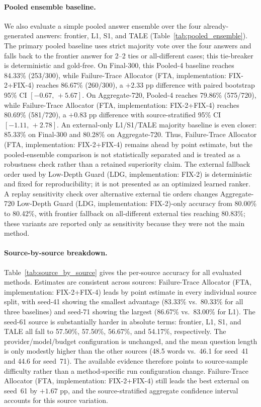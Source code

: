 \paragraph{Pooled ensemble baseline.}
We also evaluate a simple pooled answer ensemble over the four already-generated
answers: frontier, L1, S1, and TALE (Table~\ref{tab:pooled_ensemble}).
The primary pooled baseline uses strict majority vote over the four answers and
falls back to the frontier answer for 2--2 ties or all-different cases; this
tie-breaker is deterministic and gold-free.
On Final-300, this Pooled-4 baseline reaches 84.33\% (253/300), while Failure-Trace Allocator (FTA, implementation: FIX-2+FIX-4)
reaches 86.67\% (260/300), a $+2.33$ pp difference with paired bootstrap 95\% CI
$[-0.67,\,+5.67]$.
On Aggregate-720, Pooled-4 reaches 79.86\% (575/720), while Failure-Trace Allocator (FTA, implementation: FIX-2+FIX-4) reaches
80.69\% (581/720), a $+0.83$ pp difference with source-stratified 95\% CI
$[-1.11,\,+2.78]$.
An external-only L1/S1/TALE majority baseline is even closer: 85.33\% on Final-300
and 80.28\% on Aggregate-720.
Thus, Failure-Trace Allocator (FTA, implementation: FIX-2+FIX-4) remains ahead by point estimate, but the pooled-ensemble
comparison is not statistically separated and is treated as a robustness check
rather than a retained superiority claim.
The external fallback order used by Low-Depth Guard (LDG, implementation: FIX-2) is deterministic and fixed for
reproducibility; it is not presented as an optimized learned ranker.  A replay
sensitivity check over alternative external tie orders changes Aggregate-720
Low-Depth Guard (LDG, implementation: FIX-2)-only accuracy from 80.00\% to 80.42\%, with frontier fallback on
all-different external ties reaching 80.83\%; these variants are reported only as
sensitivity because they were not the main method.

\paragraph{Source-by-source breakdown.}
Table~\ref{tab:source_by_source} gives the per-source accuracy for all evaluated methods.
Estimates are consistent across sources: Failure-Trace Allocator (FTA, implementation: FIX-2+FIX-4) leads by point estimate in every
individual source split, with seed-41 showing the smallest advantage
(83.33\% vs.\ 80.33\% for all three baselines) and seed-71 showing the largest
(86.67\% vs.\ 83.00\% for L1).
The seed-61 source is substantially harder in absolute terms: frontier, L1, S1,
and TALE all fall to 57.50\%, 57.50\%, 56.67\%, and 54.17\%, respectively.
The provider/model/budget configuration is unchanged, and the mean question length
is only modestly higher than the other sources (48.5 words vs.\ 46.1 for seed~41
and 44.6 for seed~71).
The available evidence therefore points to source-sample difficulty rather than a
method-specific run configuration change.
Failure-Trace Allocator (FTA, implementation: FIX-2+FIX-4) still leads the best external on seed~61 by $+1.67$ pp, and the
source-stratified aggregate confidence interval accounts for this source variation.

